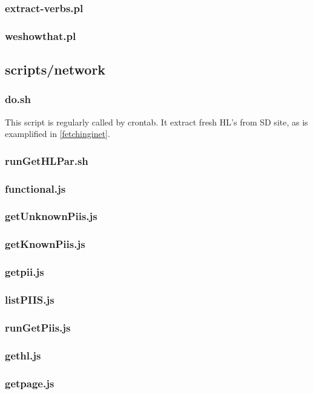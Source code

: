 \documentclass[a4paper,11pt]{report}
\begin{document}
\subsubsection{extract-verbs.pl}
\subsubsection{weshowthat.pl}
%
%
\subsection{scripts/network}
\subsubsection{do.sh}
This script is regularly called by crontab. It extract fresh HL's from SD site, as is examplified in \ref{fetchinginet}.


\subsubsection{runGetHLPar.sh}
\subsubsection{functional.js}
\subsubsection{getUnknownPiis.js}
\subsubsection{getKnownPiis.js}
\subsubsection{getpii.js}
\subsubsection{listPIIS.js}
\subsubsection{runGetPiis.js}
\subsubsection{gethl.js}
\subsubsection{getpage.js}
\end{document}
